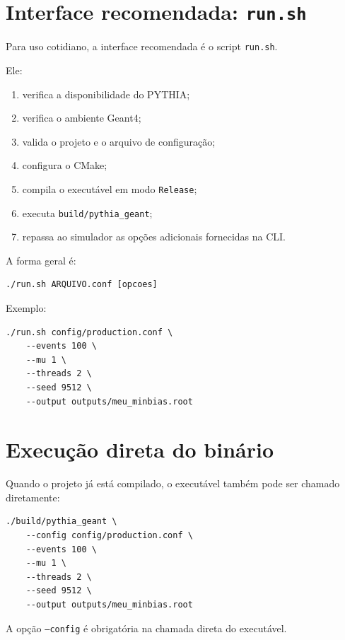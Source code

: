 \documentclass[11pt,a4paper]{article}
\begin{document}
\section{Interface recomendada: \texttt{run.sh}}

Para uso cotidiano, a interface recomendada é o script \texttt{run.sh}.

Ele:

\begin{enumerate}
  \item verifica a disponibilidade do PYTHIA;
  \item verifica o ambiente Geant4;
  \item valida o projeto e o arquivo de configuração;
  \item configura o CMake;
  \item compila o executável em modo \texttt{Release};
  \item executa \texttt{build/pythia\_geant};
  \item repassa ao simulador as opções adicionais fornecidas na CLI.
\end{enumerate}

A forma geral é:

\begin{lstlisting}[style=shell]
./run.sh ARQUIVO.conf [opcoes]
\end{lstlisting}

Exemplo:

\begin{lstlisting}[style=shell]
./run.sh config/production.conf \
    --events 100 \
    --mu 1 \
    --threads 2 \
    --seed 9512 \
    --output outputs/meu_minbias.root
\end{lstlisting}

\section{Execução direta do binário}

Quando o projeto já está compilado, o executável também pode ser chamado
diretamente:

\begin{lstlisting}[style=shell]
./build/pythia_geant \
    --config config/production.conf \
    --events 100 \
    --mu 1 \
    --threads 2 \
    --seed 9512 \
    --output outputs/meu_minbias.root
\end{lstlisting}

A opção \texttt{--config} é obrigatória na chamada direta do executável.
\end{document}
